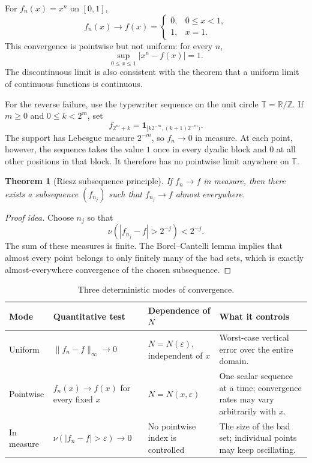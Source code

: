 \documentclass[10pt,a4paper]{article}
\numberwithin{equation}{section}
\theoremstyle{blueplain}
\newtheorem{theorem}{Theorem}[section]
\theoremstyle{definition}
\newcommand{\R}{\mathbb R}
\newcommand{\ind}{\mathbf 1}
\begin{document}
For \(f_n(x)=x^n\) on \([0,1]\),
\[
  f_n(x)\longrightarrow
  f(x)=
  \begin{cases}
    0,&0\le x<1,\\
    1,&x=1.
  \end{cases}
\]
This convergence is pointwise but not uniform: for every \(n\),
\[
  \sup_{0\le x\le1}|x^n-f(x)|=1.
\]
The discontinuous limit is also consistent with the theorem that a uniform
limit of continuous functions is continuous.

For the reverse failure, use the typewriter sequence on the unit circle
\(\mathbb T=\R/\mathbb Z\).  If \(m\ge0\) and \(0\le k<2^m\), set
\begin{equation}
  f_{2^m+k}
  =\ind_{[k2^{-m},(k+1)2^{-m})}.
  \label{eq:typewriter}
\end{equation}
The support has Lebesgue measure \(2^{-m}\), so \(f_n\to0\) in measure.
At each point, however, the sequence takes the value \(1\) once in every
dyadic block and \(0\) at all other positions in that block.  It therefore
has no pointwise limit anywhere on \(\mathbb T\).

\begin{theorem}[Riesz subsequence principle]
If \(f_n\to f\) in measure, then there exists a subsequence
\((f_{n_j})\) such that \(f_{n_j}\to f\) almost everywhere.
\end{theorem}

\begin{proof}[Proof idea]
Choose \(n_j\) so that
\[
  \nu\!\left(|f_{n_j}-f|>2^{-j}\right)<2^{-j}.
\]
The sum of these measures is finite.  The Borel--Cantelli lemma implies that
almost every point belongs to only finitely many of the bad sets, which is
exactly almost-everywhere convergence of the chosen subsequence.
\end{proof}

\begin{table}[ht]
\centering
\caption{Three deterministic modes of convergence.}
\small
\begin{tabularx}{\textwidth}{@{}
  >{\raggedright\arraybackslash}p{2.8cm}
  >{\raggedright\arraybackslash}p{4.1cm}
  >{\raggedright\arraybackslash}p{3.4cm}
  >{\raggedright\arraybackslash}X@{}}
\toprule
Mode & Quantitative test & Dependence of \(N\) & What it controls \\
\midrule
Uniform
& \(\|f_n-f\|_\infty\to0\)
& \(N=N(\varepsilon)\), independent of \(x\)
& Worst-case vertical error over the entire domain. \\
\addlinespace
Pointwise
& \(f_n(x)\to f(x)\) for every fixed \(x\)
& \(N=N(x,\varepsilon)\)
& One scalar sequence at a time; convergence rates may vary arbitrarily with \(x\). \\
\addlinespace
In measure
& \(\nu(|f_n-f|>\varepsilon)\to0\)
& No pointwise index is controlled
& The size of the bad set; individual points may keep oscillating. \\
\bottomrule
\end{tabularx}
\end{table}
\end{document}
